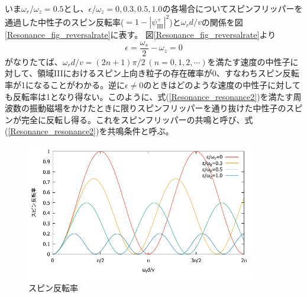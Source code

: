 いま$\omega_r/\omega_z=0.5$とし、$\epsilon/\omega_z=0,0.3,0.5,1.0$の各場合についてスピンフリッパーを通過した中性子のスピン反転率($=1-|\psi_\mathrm{III}^+|^2$)と$\omega_r d/v$の関係を図\ref{Resonance_fig_reversalrate}に表す。
図\ref{Resonance_fig_reversalrate}より
\begin{equation}
\epsilon=\frac{\omega_s}{2}-\omega_z=0 \label{Resonance_resonance2}
\end{equation}
がなりたてば、$\omega_r d/v =(2n+1)\pi/2 \ (n =0,1,2,\cdots)$を満たす速度の中性子に対して、領域IIIにおけるスピン上向き粒子の存在確率が0、すなわちスピン反転率が1になることがわかる。逆に$\epsilon \neq 0$のときはどのような速度の中性子に対しても反転率は1となり得ない。このように、式(\ref{Resonance_resonance2})を満たす周波数の振動磁場をかけたときに限りスピンフリッパーを通り抜けた中性子のスピンが完全に反転し得る。これをスピンフリッパーの共鳴と呼び、式(\ref{Resonance_resonance2})を共鳴条件と呼ぶ。
\begin{figure}[h]
\begin{center}
\includegraphics[width=10cm]{resonance/whatwhyhow/resonance_reversalrate.pdf}
\caption{スピン反転率}
\label{Resonance_fig_reversal}
\end{center}
\end{figure}

